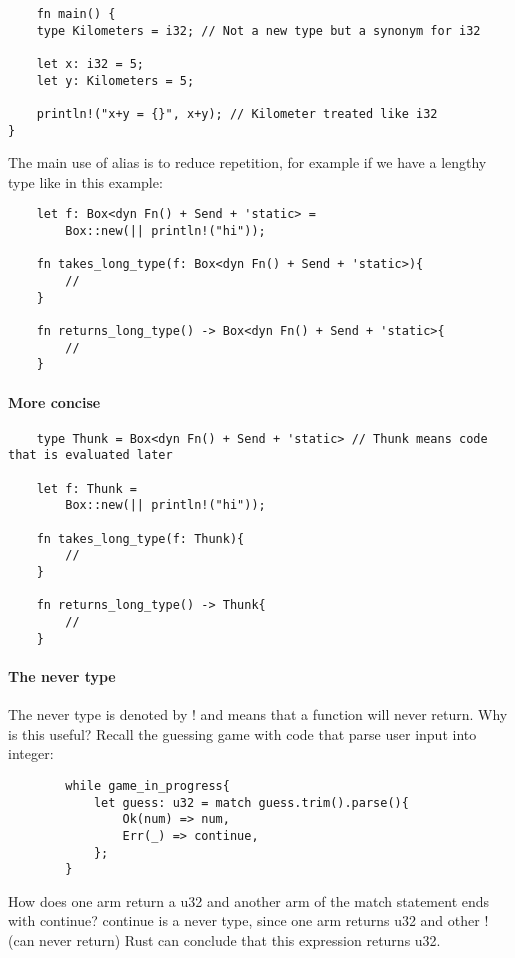 \begin{lstlisting}
    fn main() {
    type Kilometers = i32; // Not a new type but a synonym for i32

    let x: i32 = 5;
    let y: Kilometers = 5;

    println!("x+y = {}", x+y); // Kilometer treated like i32
}
\end{lstlisting}
The main use of alias is to reduce repetition, for example if we have a lengthy type like in this example:\begin{lstlisting}
    let f: Box<dyn Fn() + Send + 'static> = 
        Box::new(|| println!("hi"));

    fn takes_long_type(f: Box<dyn Fn() + Send + 'static>){
        //
    }

    fn returns_long_type() -> Box<dyn Fn() + Send + 'static>{ 
        //
    }
\end{lstlisting} 

\paragraph*{More concise}\begin{lstlisting}
    type Thunk = Box<dyn Fn() + Send + 'static> // Thunk means code that is evaluated later
    
    let f: Thunk = 
        Box::new(|| println!("hi"));

    fn takes_long_type(f: Thunk){
        //
    }

    fn returns_long_type() -> Thunk{ 
        //
    }
\end{lstlisting}

\paragraph*{The never type}

The never type is denoted by ! and means that a function will never return. Why is this useful? Recall the guessing game with code that parse user input into integer:\begin{lstlisting}
        while game_in_progress{
            let guess: u32 = match guess.trim().parse(){
                Ok(num) => num,
                Err(_) => continue,
            };
        }
\end{lstlisting}
How does one arm return a u32 and another arm of the match statement ends with continue? continue is a never type, since one arm returns u32 and other ! (can never return) Rust can conclude that this expression returns u32.

